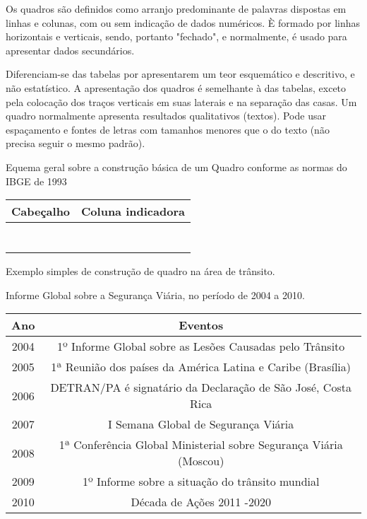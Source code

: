 \inic Os quadros são definidos como arranjo predominante de palavras dispostas em linhas e colunas, com ou sem indicação de dados numéricos. È formado por linhas horizontais e verticais, sendo, portanto "fechado", e normalmente, é usado para apresentar dados secundários.\vskip0.3cm 

\inic Diferenciam-se das tabelas por apresentarem um teor esquemático e descritivo, e não estatístico. A apresentação dos quadros é semelhante à das tabelas, exceto pela colocação dos traços verticais em suas laterais e na separação das casas. Um quadro normalmente apresenta resultados qualitativos (textos). Pode usar espaçamento e fontes de letras com tamanhos menores que o do texto (não precisa seguir o mesmo padrão).   

\begin{quadro}[h!tp]
    \centering
    \caption{Equema geral sobre a construção básica de um Quadro conforme as normas do IBGE de 1993}
    \begin{tabular}{|c|l|}
    \hline
    Cabeçalho  & Coluna indicadora   \\    
    \hline
           &           \\
           &              \\
           &              \\
           &              \\
           &              \\
           &              \\
           &              \\
  \hline
    \end{tabular}
\end{quadro}


Exemplo simples de construção de quadro na área de trânsito. 

\begin{quadro}[htp!]
    \centering
    \caption{Informe Global sobre a Segurança Viária, no período de 2004 a 2010.}
    \begin{tabular}{|c|c|}
    \hline\hline
    Ano    & Eventos  \\    
    \hline\hline
     2004  & 1º Informe Global sobre as Lesões Causadas pelo Trânsito     \\
     2005  & 1ª Reunião dos países da América Latina e Caribe (Brasília)  \\
     2006  & DETRAN/PA é signatário da Declaração de São José, Costa Rica  \\
     2007  & I Semana Global de Segurança Viária \\
     2008  & 1ª Conferência Global Ministerial sobre Segurança Viária (Moscou) \\
     2009  & 1º Informe sobre a situação do trânsito mundial \\
     2010  & Década de Ações 2011 -2020 \\
  \hline\hline
    \end{tabular}
\end{quadro}



